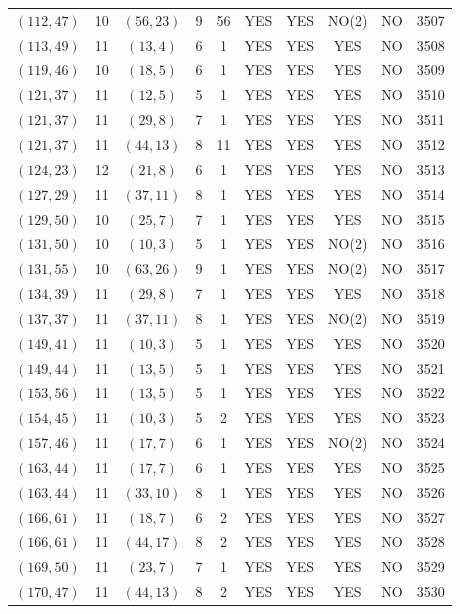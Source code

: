 \begin{longtable}{|c|c|c|c|c|c|c|c|c|c|}
$(112, 47)$ & 10 & $(56, 23)$ & 9 & 56 & YES & YES & NO(2) & NO & 3507\\
$(113, 49)$ & 11 & $(13, 4)$ & 6 & 1 & YES & YES & YES & NO & 3508\\
$(119, 46)$ & 10 & $(18, 5)$ & 6 & 1 & YES & YES & YES & NO & 3509\\
$(121, 37)$ & 11 & $(12, 5)$ & 5 & 1 & YES & YES & YES & NO & 3510\\
$(121, 37)$ & 11 & $(29, 8)$ & 7 & 1 & YES & YES & YES & NO & 3511\\
$(121, 37)$ & 11 & $(44, 13)$ & 8 & 11 & YES & YES & YES & NO & 3512\\
$(124, 23)$ & 12 & $(21, 8)$ & 6 & 1 & YES & YES & YES & NO & 3513\\
$(127, 29)$ & 11 & $(37, 11)$ & 8 & 1 & YES & YES & YES & NO & 3514\\
$(129, 50)$ & 10 & $(25, 7)$ & 7 & 1 & YES & YES & YES & NO & 3515\\
$(131, 50)$ & 10 & $(10, 3)$ & 5 & 1 & YES & YES & NO(2) & NO & 3516\\
$(131, 55)$ & 10 & $(63, 26)$ & 9 & 1 & YES & YES & NO(2) & NO & 3517\\
$(134, 39)$ & 11 & $(29, 8)$ & 7 & 1 & YES & YES & YES & NO & 3518\\
$(137, 37)$ & 11 & $(37, 11)$ & 8 & 1 & YES & YES & NO(2) & NO & 3519\\
$(149, 41)$ & 11 & $(10, 3)$ & 5 & 1 & YES & YES & YES & NO & 3520\\
$(149, 44)$ & 11 & $(13, 5)$ & 5 & 1 & YES & YES & YES & NO & 3521\\
$(153, 56)$ & 11 & $(13, 5)$ & 5 & 1 & YES & YES & YES & NO & 3522\\
$(154, 45)$ & 11 & $(10, 3)$ & 5 & 2 & YES & YES & YES & NO & 3523\\
$(157, 46)$ & 11 & $(17, 7)$ & 6 & 1 & YES & YES & NO(2) & NO & 3524\\
$(163, 44)$ & 11 & $(17, 7)$ & 6 & 1 & YES & YES & YES & NO & 3525\\
$(163, 44)$ & 11 & $(33, 10)$ & 8 & 1 & YES & YES & YES & NO & 3526\\
$(166, 61)$ & 11 & $(18, 7)$ & 6 & 2 & YES & YES & YES & NO & 3527\\
$(166, 61)$ & 11 & $(44, 17)$ & 8 & 2 & YES & YES & YES & NO & 3528\\
$(169, 50)$ & 11 & $(23, 7)$ & 7 & 1 & YES & YES & YES & NO & 3529\\
$(170, 47)$ & 11 & $(44, 13)$ & 8 & 2 & YES & YES & YES & NO & 3530\\

\end{longtable}

